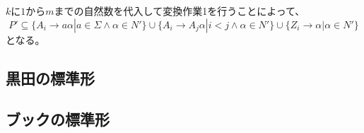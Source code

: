 \documentclass[a4paper]{jarticle}
\begin{document}
$ k $に$ 1 $から$ m $までの自然数を代入して変換作業1を行うことによって、
\begin{equation}
	P' \subseteq \bigl\{ A _i \to a \alpha | a \in \Sigma \land \alpha \in N' \bigr\} \cup \bigl\{ A _i \to A _j \alpha | i < j \land \alpha \in N' \bigr\} \cup \bigl\{ Z _i \to \alpha | \alpha \in N' \bigr\}
\end{equation}
となる。
\subsection{黒田の標準形}
\subsection{ブックの標準形}
\end{document}
